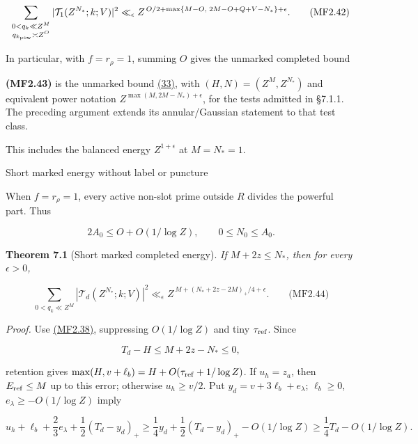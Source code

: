 \hypertarget{mf:eq:B2.42}{}

\label{mf:eq:B2.42}

\[
\sum_{\substack{0<q_k\ll Z^M\\q_{k_{\rm pow}}\asymp Z^O}}
|\mathcal T_1(Z^{N_*};k;V)|^2
\ll_\epsilon
Z^{\,O/2+\max\{M-O,\;2M-O+Q+V-N_*\}+\epsilon}.
\qquad\text{(MF2.42)}
\]

In particular, with \(f=r_\rho=1\), summing \(O\) gives the unmarked completed bound

\hypertarget{mf:eq:B2.43}{}

\label{mf:eq:B2.43}

\textbf{(MF2.43)} is the unmarked bound \protect\hyperlink{cf:eq:4.4}{(33)}, with \((H,N)=(Z^M,Z^{N_*})\) and equivalent power notation \(Z^{\max(M,2M-N_*)+\epsilon}\), for the tests admitted in §7.1.1. The preceding argument extends its annular/Gaussian statement to that test class.

This includes the balanced energy \(Z^{1+\epsilon}\) at \(M=N_*=1\).

\hypertarget{short-marked-energy-without-label-or-puncture}{}

\label{short-marked-energy-without-label-or-puncture}

Short marked energy without label or puncture

When \(f=r_\rho=1\), every active non-slot prime outside \(R\) divides the powerful part. Thus

\[
2A_0\le O+O(1/\log Z),\qquad 0\le N_0\le A_0.
\]

\textbf{Theorem 7.1} (Short marked completed energy). \emph{\hypertarget{mf:marked-energy}{}\label{mf:marked-energy}If \(M+2z\le N_*\), then for every \(\epsilon>0\), \hypertarget{mf:eq:B2.44}{}\label{mf:eq:B2.44}}

\[
\sum_{0<q_k\ll Z^M}|\mathcal T_d(Z^{N_*};k;V)|^2
\ll_\epsilon
Z^{\,M+(N_*+2z-2M)_+/4+\epsilon}.
\qquad\text{(MF2.44)}
\]

\emph{Proof.} Use \protect\hyperlink{mf:eq:B2.38}{(MF2.38)}, suppressing \(O(1/\log Z)\) and tiny \(\tau_{\rm ref}\). Since

\[
T_d-H\le M+2z-N_*\le0,
\]

retention gives \(\max(H,v+\ell_b)=H+O(\tau_{\rm ref}+1/\log Z)\). If \(u_h=z_a\), then \(E_{\rm ref}\le M\) up to this error; otherwise \(u_h\ge v/2\). Put \(y_d=v+3\ell_b+e_\lambda\); \(\ell_b\ge0\), \(e_\lambda\ge-O(1/\log Z)\) imply

\[
u_h+\ell_b+\frac23e_\lambda
+\frac12(T_d-y_d)_+
\ge \frac14y_d+\frac12(T_d-y_d)_+-O(1/\log Z)
\ge\frac14T_d-O(1/\log Z).
\]

